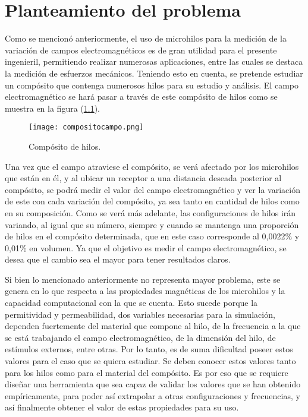 \documentclass[12pt,letterpaper]{report}
\numberwithin{equation}{section}
\begin{document}
\pagebreak

\chapter{Planteamiento del problema}

Como se mencionó anteriormente, el uso de microhilos para la medición de la variación de campos electromagnéticos es de gran utilidad para el presente ingenieril, permitiendo realizar numerosas aplicaciones, entre las cuales se destaca la medición de esfuerzos mecánicos. Teniendo esto en cuenta, se pretende estudiar un compósito que contenga numerosos hilos para su estudio y análisis. El campo electromagnético se hará pasar a través de este compósito de hilos como se muestra en la figura (\ref{fig: compositoproblema.png}).

\begin{figure}[H]
	\centering\texttt{[image: compositocampo.png]}
	\caption{Compósito de hilos. \cite{Wire_theory_3}}
	\label{fig: compositoproblema.png}
\end{figure} 

Una vez que el campo atraviese el compósito, se verá afectado por los microhilos que están en él, y al ubicar un receptor a una distancia deseada posterior al compósito, se podrá medir el valor del campo electromagnético y ver la variación de este con cada variación del compósito, ya sea tanto en cantidad de hilos como en su composición. Como se verá más adelante, las configuraciones de hilos irán variando, al igual que su número, siempre y cuando se mantenga una proporción de hilos en el compósito determinada, que en este caso corresponde al 0,0022\% y 0,01\% en volumen. Ya que el objetivo es medir el campo electromagnético, se desea que el cambio sea el mayor para tener resultados claros.

Si bien lo mencionado anteriormente no representa mayor problema, este se genera en lo que respecta a las propiedades magnéticas de los microhilos y la capacidad computacional con la que se cuenta. Esto sucede porque la permitividad y permeabilidad, dos variables necesarias para la simulación, dependen fuertemente del material que compone al hilo, de la frecuencia a la que se está trabajando el campo electromagnético, de la dimensión del hilo, de estímulos externos, entre otras. Por lo tanto, es de suma dificultad poseer estos valores para el caso que se quiera estudiar. Se deben conocer estos valores tanto para los hilos como para el material del compósito. Es por eso que se requiere diseñar una herramienta que sea capaz de validar los valores que se han obtenido empíricamente, para poder así extrapolar a otras configuraciones y frecuencias, y así finalmente obtener el valor de estas propiedades para su uso.
 
\end{document}

